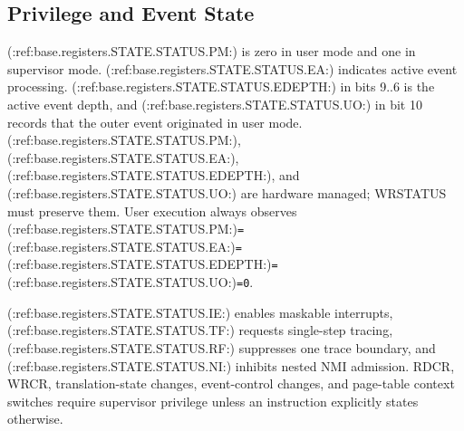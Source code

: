 \subsection{Privilege and Event State}
(:ref:base.registers.STATE.STATUS.PM:) is zero in user mode and one in supervisor mode. (:ref:base.registers.STATE.STATUS.EA:) indicates active event processing. (:ref:base.registers.STATE.STATUS.EDEPTH:) in bits 9..6 is the active event depth, and (:ref:base.registers.STATE.STATUS.UO:) in bit 10 records that the outer event originated in user mode. (:ref:base.registers.STATE.STATUS.PM:), (:ref:base.registers.STATE.STATUS.EA:), (:ref:base.registers.STATE.STATUS.EDEPTH:), and (:ref:base.registers.STATE.STATUS.UO:) are hardware managed; WRSTATUS must preserve them. User execution always observes (:ref:base.registers.STATE.STATUS.PM:)\texttt{=}(:ref:base.registers.STATE.STATUS.EA:)\texttt{=}(:ref:base.registers.STATE.STATUS.EDEPTH:)\texttt{=}(:ref:base.registers.STATE.STATUS.UO:)\texttt{=0}.

(:ref:base.registers.STATE.STATUS.IE:) enables maskable interrupts, (:ref:base.registers.STATE.STATUS.TF:) requests single-step tracing, (:ref:base.registers.STATE.STATUS.RF:) suppresses one trace boundary, and (:ref:base.registers.STATE.STATUS.NI:) inhibits nested NMI admission. RDCR, WRCR, translation-state changes, event-control changes, and page-table context switches require supervisor privilege unless an instruction explicitly states otherwise.
